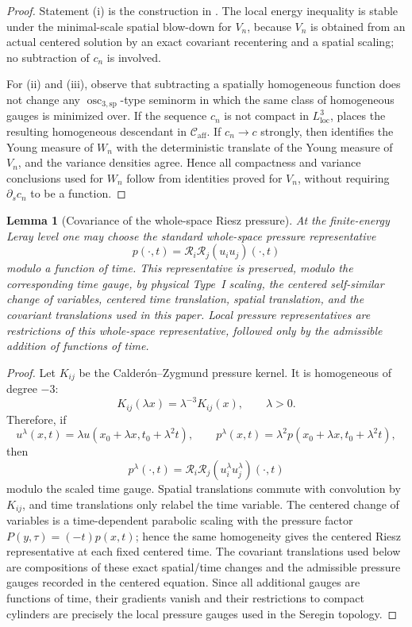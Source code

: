\documentclass[11pt]{amsart}
\numberwithin{equation}{section}
\theoremstyle{plain}
\newtheorem{lemma}[lemma]{Lemma}
\theoremstyle{definition}
\theoremstyle{remark}
\newcommand{\loc}{\mathrm{loc}}
\newcommand{\Caff}{\mathcal C_{\mathrm{aff}}}
\newcommand{\oscsp}{\operatorname{osc}_{3,\mathrm{sp}}}
\begin{document}
\begin{proof}
Statement (i) is the construction in
.  The local energy inequality is stable
under the minimal-scale spatial blow-down for \(V_n\), because \(V_n\) is obtained
from an actual centered solution by an exact covariant recentering and a spatial
scaling; no subtraction of \(c_n\) is involved.

For (ii) and (iii), observe that subtracting a spatially homogeneous function
does not change any \(\oscsp\)-type seminorm in which the same class of
homogeneous gauges is minimized over.  If the sequence \(c_n\) is not
compact in \(L^3_{\loc}\),  places the
resulting homogeneous descendant in \(\Caff\).  If \(c_n\to c\) strongly, then
 identifies the Young measure of \(W_n\)
with the deterministic translate of the Young measure of \(V_n\), and the
variance densities agree.  Hence all compactness and variance conclusions used
for \(W_n\) follow from identities proved for \(V_n\), without requiring
\(\partial_s c_n\) to be a function.
\end{proof}

\begin{lemma}[Covariance of the whole-space Riesz pressure]
\label{lem:whole-space-riesz-pressure-covariance}
At the finite-energy Leray level one may choose the standard whole-space
pressure representative
\[
   p(\cdot,t)=\mathcal R_i\mathcal R_j(u_i u_j)(\cdot,t)
\]
modulo a function of time.  This representative is preserved, modulo the
corresponding time gauge, by physical Type~I scaling, the centered
self-similar change of variables, centered time translation, spatial
translation, and the covariant translations used in this paper.  Local pressure
representatives are restrictions of this whole-space representative, followed
only by the admissible addition of functions of time.
\end{lemma}

\begin{proof}
Let \(K_{ij}\) be the Calder\'on--Zygmund pressure kernel.  It is homogeneous of
degree \(-3\):
\[
   K_{ij}(\lambda x)=\lambda^{-3}K_{ij}(x),\qquad \lambda>0 .
\]
Therefore, if
\[
   u^\lambda(x,t)=\lambda u(x_0+\lambda x,t_0+\lambda^2t),
   \qquad
   p^\lambda(x,t)=\lambda^2p(x_0+\lambda x,t_0+\lambda^2t),
\]
then
\[
   p^\lambda(\cdot,t)
   =
   \mathcal R_i\mathcal R_j
   (u^\lambda_i u^\lambda_j)(\cdot,t)
\]
modulo the scaled time gauge.  Spatial translations commute with convolution by
\(K_{ij}\), and time translations only relabel the time variable.  The centered
change of variables is a time-dependent parabolic scaling with the
pressure factor \(P(y,\tau)=(-t)p(x,t)\); hence the same homogeneity gives the
centered Riesz representative at each fixed centered time.  The covariant
translations used below are compositions of these exact spatial/time changes
and the admissible pressure gauges recorded in the centered equation.  Since
all additional gauges are functions of time, their gradients vanish and their
restrictions to compact cylinders are precisely the local pressure gauges used
in the Seregin topology.
\end{proof}
\end{document}
